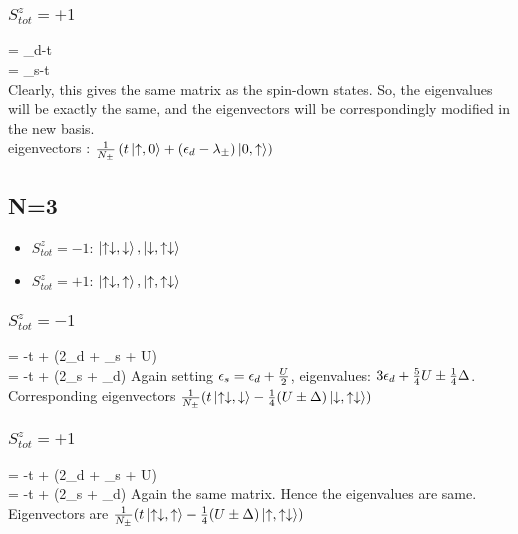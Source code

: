 \documentclass{article}
\begin{document}
\subsubsection{\(S_{tot}^z = +1\)}
\beq
\ham{} = \epsilon_d-t \\
\ham{} = \epsilon_s-t \\
\eeq
Clearly, this gives the same matrix as the spin-down states. So, the eigenvalues will be exactly the same, and the eigenvectors will be correspondingly modified in the new basis. \\
eigenvectors : \(\frac{1}{N_\pm}\left({t\ket{\uparrow,0}+(\epsilon_d-\lambda_\pm)\ket{0,\uparrow}}\right)\)
\subsection{N=3}
\begin{itemize}
\item \(S_{tot}^z = -1\): \(\ket{\uparrow\downarrow,\downarrow}, \ket{\downarrow,\uparrow\downarrow}\)
\item \(S_{tot}^z = +1\): \(\ket{\uparrow\downarrow,\uparrow}, \ket{\uparrow,\uparrow\downarrow}\)
\end{itemize}
\subsubsection{\(S_{tot}^z = -1\)}
\beq
\ham \ket{\uparrow\downarrow,\downarrow} = -t\ket{\downarrow,\uparrow\downarrow} + (2\epsilon_d + \epsilon_s + U)\ket{\uparrow\downarrow,\downarrow} \\
\ham \ket{\downarrow,\uparrow\downarrow} = -t\ket{\uparrow\downarrow,\downarrow} + (2\epsilon_s + \epsilon_d)\ket{\downarrow,\uparrow\downarrow}
\eeq
\beq
{}
\eeq
Again setting \(\epsilon_s = \epsilon_d + \frac{U}{2}\), eigenvalues: \(3\epsilon_d + \frac{5}{4}U \pm \frac{1}{4}\Delta\). \\ Corresponding eigenvectors \(\frac{1}{N_\pm}(t\ket{\uparrow\downarrow,\downarrow}-\frac{1}{4}(U\pm\Delta)\ket{\downarrow,\uparrow\downarrow})\)

\subsubsection{\(S_{tot}^z = +1\)}
\beq
\ham \ket{\uparrow\downarrow,\uparrow} = -t\ket{\uparrow,\uparrow\downarrow} + (2\epsilon_d + \epsilon_s + U)\ket{\uparrow\downarrow,\uparrow} \\
\ham \ket{\uparrow,\uparrow\downarrow} = -t\ket{\uparrow\downarrow,\uparrow} + (2\epsilon_s + \epsilon_d)\ket{\uparrow,\uparrow\downarrow}
\eeq
Again the same matrix. Hence the eigenvalues are same. Eigenvectors are
\(\frac{1}{N_\pm}(t\ket{\uparrow\downarrow,\uparrow}-\frac{1}{4}(U\pm\Delta)\ket{\uparrow,\uparrow\downarrow})\)
\end{document}
